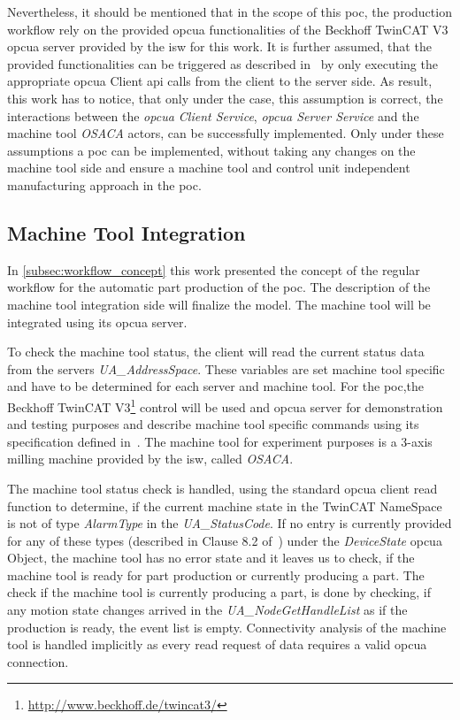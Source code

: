 \documentclass[
a4paper,
twoside,
headsepline,
cleardoublepage=empty,
parskip=half,
draft=false
]{scrbook}
\begin{document}
				Nevertheless, it should be mentioned that in the scope of this \gls{poc}, the production workflow rely on the provided \gls{opcua} functionalities of the Beckhoff TwinCAT V3 \gls{opcua} server provided by the \gls{isw} for this work. It is further assumed, that the provided functionalities can be triggered as described in~\cite{twincat2018} by only executing the appropriate \gls{opcua} Client \gls{api} calls from the client to the server side. As result, this work has to notice, that only under the case, this assumption is correct, the interactions between the \textit{\gls{opcua} Client Service}, \textit{\gls{opcua} Server Service} and the machine tool \textit{OSACA} actors, can be successfully implemented. 
				Only under these assumptions a \gls{poc} can be implemented, without taking any changes on the machine tool side and ensure a machine tool and control unit independent manufacturing approach in the \gls{poc}.

			\subsection{Machine Tool Integration} \label{subsec:machine_tool_intergation}

				In \cref{subsec:workflow_concept} this work presented the concept of the regular workflow for the automatic part production of the \gls{poc}. 
				The description of the machine tool integration side will finalize the model. 
				The machine tool will be integrated using its \gls{opcua} server.

				To check the machine tool status, the client will read the current status data from the servers \textit{UA\_AddressSpace}. 
				These variables are set machine tool specific and have to be determined for each server and machine tool. 
				For the \gls{poc},the Beckhoff TwinCAT V3\footnote{\url{http://www.beckhoff.de/twincat3/}} control will be used and \gls{opcua} server for demonstration and testing purposes and describe machine tool specific commands using its specification defined in~\cite{twincat2018}. 
				The machine tool for experiment purposes is a 3-axis milling machine provided by the \gls{isw}, called \textit{OSACA}.

				The machine tool status check is handled, using the standard \gls{opcua} client read function to determine, if the current machine state in the TwinCAT NameSpace is not of type \textit{AlarmType} in the \textit{UA\_StatusCode}. If no entry is currently provided for any of these types (described in Clause 8.2 of~\cite{twincat2018}) under the \textit{DeviceState} \gls{opcua} Object, the machine tool has no error state and it leaves us to check, if the machine tool is ready for part production or currently producing a part. The check if the machine tool is currently producing a part, is done by checking, if any motion state changes arrived in the \textit{UA\_NodeGetHandleList} as if the production is ready, the event list is empty. Connectivity analysis of the machine tool is handled implicitly as every read request of data requires a valid \gls{opcua} connection.
\end{document}
